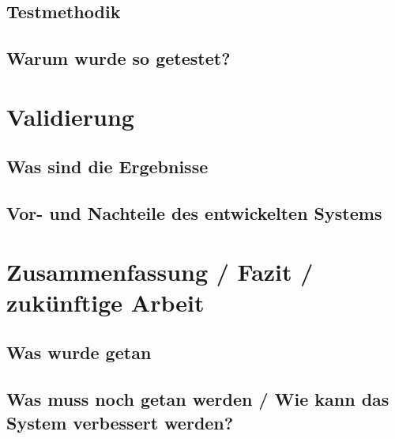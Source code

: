 \documentclass[a4paper,12pt]{article}
\begin{document}
\subsection{Testmethodik}
\blindtext
\subsection{Warum wurde so getestet?}
\blindtext
\section{Validierung}
\blindtext
\subsection{Was sind die Ergebnisse}
\blindtext
\subsection{Vor- und Nachteile des entwickelten Systems}
\blindtext
\section{Zusammenfassung / Fazit / zukünftige Arbeit}
\blindtext
\subsection{Was wurde getan}
\blindtext
\subsection{Was muss noch getan werden / Wie kann das System verbessert werden?}
\blindtext

\end{document}
